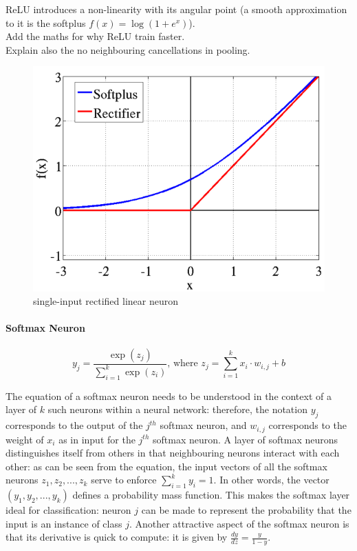 \documentclass[a4paper,11pt]{article}
\begin{document}
ReLU introduces a non-linearity with its angular point (a smooth approximation to it is the softplus $f(x) = \log(1 + e^x)$). \\

Add the maths for why ReLU train faster. \\

Explain also the no neighbouring cancellations in pooling. \\

\begin{figure}[h!]
	\centering
	\includegraphics[scale=0.3]{images/rectifier.png}
	\caption{single-input rectified linear neuron}
\end{figure}

\paragraph{Softmax Neuron}
\begin{equation}
\label{}
y_{j} = \frac{\exp(z_{j})}{\sum\limits_{i=1}^k\exp(z_{i})} \text{, where } z_{j} = \sum\limits_{i=1}^k x_{i}\cdot w_{i,j} + b
\end{equation}

The equation of a softmax neuron needs to be understood in the context of a layer of $k$ such neurons within a neural network: therefore, the notation $y_{j}$ corresponds to the output of the $j^{th}$ softmax neuron, and $w_{i,j}$ corresponds to the weight of $x_{i}$ as in input for the $j^{th}$ softmax neuron. A layer of softmax neurons distinguishes itself from others in that neighbouring neurons interact with each other: as can be seen from the equation, the input vectors of all the softmax neurons $z_{1}, z_{2}, ..., z_{k}$ serve to enforce $\sum\limits_{i=1}^k y_{i} = 1$. In other words, the vector $(y_{1}, y_{2}, ..., y_{k})$ defines a probability mass function. This makes the softmax layer ideal for classification: neuron $j$ can be made to represent the probability that the input is an instance of class $j$. Another attractive aspect of the softmax neuron is that its derivative is quick to compute: it is given by $\frac{dy}{dz} = \frac{y}{1-y}$. \\
\end{document}
